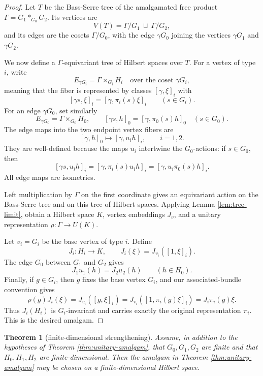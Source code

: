 \documentclass[11pt]{article}
\newtheorem{theorem}{Theorem}
\begin{document}
\begin{proof}
Let \(T\) be the Bass-Serre tree of the amalgamated free product
\(\Gamma=G_1*_{G_0}G_2\).  Its vertices are
\[
V(T)=\Gamma/G_1\ \sqcup\ \Gamma/G_2,
\]
and its edges are the cosets \(\Gamma/G_0\), with the edge \(\gamma G_0\)
joining the vertices \(\gamma G_1\) and \(\gamma G_2\).

We now define a \(\Gamma\)-equivariant tree of Hilbert spaces over \(T\).
For a vertex of type \(i\), write
\[
E_{\gamma G_i}=\Gamma\times_{G_i} H_i
\quad\text{over the coset }\gamma G_i,
\]
meaning that the fiber is represented by classes \([\gamma,\xi]_i\) with
\[
[\gamma s,\xi]_i=[\gamma,\pi_i(s)\xi]_i\qquad(s\in G_i).
\]
For an edge \(\gamma G_0\), set similarly
\[
E_{\gamma G_0}=\Gamma\times_{G_0} H_0,
\qquad
[\gamma s,h]_0=[\gamma,\pi_0(s)h]_0\quad(s\in G_0).
\]
The edge maps into the two endpoint vertex fibers are
\[
[\gamma,h]_0\longmapsto [\gamma,u_i h]_i,\qquad i=1,2.
\]
They are well-defined because the maps \(u_i\) intertwine the \(G_0\)-actions:
if \(s\in G_0\), then
\[
[\gamma s,u_i h]_i=[\gamma,\pi_i(s)u_i h]_i
=[\gamma,u_i\pi_0(s)h]_i.
\]
All edge maps are isometries.

Left multiplication by \(\Gamma\) on the first coordinate gives an equivariant
action on the Bass-Serre tree and on this tree of Hilbert spaces.  Applying
Lemma \ref{lem:tree-limit}, obtain a Hilbert space \(K\), vertex embeddings
\(J_v\), and a unitary representation \(\rho\colon\Gamma\to U(K)\).

Let \(v_i=G_i\) be the base vertex of type \(i\).  Define
\[
J_i\colon H_i\to K,\qquad J_i(\xi)=J_{v_i}([1,\xi]_i).
\]
The edge \(G_0\) between \(G_1\) and \(G_2\) gives
\[
J_1u_1(h)=J_2u_2(h)\qquad(h\in H_0).
\]
Finally, if \(g\in G_i\), then \(g\) fixes the base vertex \(G_i\), and our
associated-bundle convention gives
\[
\rho(g)J_i(\xi)
=J_{v_i}([g,\xi]_i)
=J_{v_i}([1,\pi_i(g)\xi]_i)
=J_i\pi_i(g)\xi.
\]
Thus \(J_i(H_i)\) is \(G_i\)-invariant and carries exactly the original
representation \(\pi_i\).  This is the desired amalgam.
\end{proof}

\begin{theorem}[finite-dimensional strengthening]
\label{thm:finite-dimensional}
Assume, in addition to the hypotheses of Theorem
\ref{thm:unitary-amalgam}, that \(G_0,G_1,G_2\) are finite and that
\(H_0,H_1,H_2\) are finite-dimensional.  Then the amalgam in Theorem
\ref{thm:unitary-amalgam} may be chosen on a finite-dimensional Hilbert space.
\end{theorem}
\end{document}
